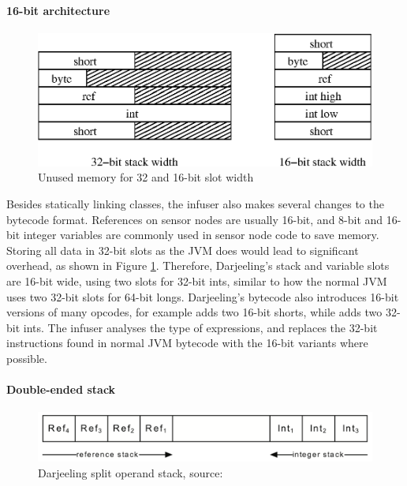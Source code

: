 \paragraph{16-bit architecture}
\begin{figure}
\centering
\includegraphics[width=0.6\linewidth]{32bit-vs-16bit-stack}
\caption{Unused memory for 32 and 16-bit slot width}
\label{fig-32bit-vs-16bit-stack}
\end{figure}

Besides statically linking classes, the infuser also makes several changes to the bytecode format. References on sensor nodes are usually 16-bit, and 8-bit and 16-bit integer variables are commonly used in sensor node code to save memory. Storing all data in 32-bit slots as the JVM does would lead to significant overhead, as shown in Figure \ref{fig-32bit-vs-16bit-stack}. Therefore, Darjeeling's stack and variable slots are 16-bit wide, using two slots for 32-bit ints, similar to how the normal JVM uses two 32-bit slots for 64-bit longs. Darjeeling's bytecode also introduces 16-bit versions of many opcodes, for example  adds two 16-bit shorts, while  adds two 32-bit ints. The infuser analyses the type of expressions, and replaces the 32-bit instructions found in normal JVM bytecode with the 16-bit variants where possible.



\paragraph{Double-ended stack}
\begin{figure}
\centering
\includegraphics[width=0.6\linewidth]{darjeeling-split-stack}
\caption[Darjeeling split operand stack]{Darjeeling split operand stack, source: \cite{Brouwers:2009cj}}
\label{fig-darjeeling-split-stack}
\end{figure}

